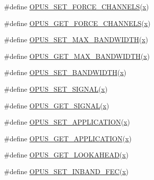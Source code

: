 \begin{DoxyCompactItemize}
\#define \hyperlink{group__opus__encoderctls_ga8450a745bd919a8de522afec115f3b5f}{O\+P\+U\+S\+\_\+\+S\+E\+T\+\_\+\+F\+O\+R\+C\+E\+\_\+\+C\+H\+A\+N\+N\+E\+LS}(\hyperlink{fmaths_8inl_a7ba8ab2f1e8f362163e17da3f15a5db9}{x})
\item 
\#define \hyperlink{group__opus__encoderctls_ga21f010167c5dfa1b53f20c46d473e86a}{O\+P\+U\+S\+\_\+\+G\+E\+T\+\_\+\+F\+O\+R\+C\+E\+\_\+\+C\+H\+A\+N\+N\+E\+LS}(\hyperlink{fmaths_8inl_a7ba8ab2f1e8f362163e17da3f15a5db9}{x})
\item 
\#define \hyperlink{group__opus__encoderctls_ga4f88288e89c595c07c61db316cc45289}{O\+P\+U\+S\+\_\+\+S\+E\+T\+\_\+\+M\+A\+X\+\_\+\+B\+A\+N\+D\+W\+I\+D\+TH}(\hyperlink{fmaths_8inl_a7ba8ab2f1e8f362163e17da3f15a5db9}{x})
\item 
\#define \hyperlink{group__opus__encoderctls_gaa3b5736de64792e1144ce12dfb87613c}{O\+P\+U\+S\+\_\+\+G\+E\+T\+\_\+\+M\+A\+X\+\_\+\+B\+A\+N\+D\+W\+I\+D\+TH}(\hyperlink{fmaths_8inl_a7ba8ab2f1e8f362163e17da3f15a5db9}{x})
\item 
\#define \hyperlink{group__opus__encoderctls_ga0178dabe5526d5b0667d81489cc93791}{O\+P\+U\+S\+\_\+\+S\+E\+T\+\_\+\+B\+A\+N\+D\+W\+I\+D\+TH}(\hyperlink{fmaths_8inl_a7ba8ab2f1e8f362163e17da3f15a5db9}{x})
\item 
\#define \hyperlink{group__opus__encoderctls_gaaa87ccee4ae46aa6c9528e03c5122b89}{O\+P\+U\+S\+\_\+\+S\+E\+T\+\_\+\+S\+I\+G\+N\+AL}(\hyperlink{fmaths_8inl_a7ba8ab2f1e8f362163e17da3f15a5db9}{x})
\item 
\#define \hyperlink{group__opus__encoderctls_ga640d434de535e2d2caec991c347303a4}{O\+P\+U\+S\+\_\+\+G\+E\+T\+\_\+\+S\+I\+G\+N\+AL}(\hyperlink{fmaths_8inl_a7ba8ab2f1e8f362163e17da3f15a5db9}{x})
\item 
\#define \hyperlink{group__opus__encoderctls_ga18fa17dae52ff8f3eaea314204bf1a36}{O\+P\+U\+S\+\_\+\+S\+E\+T\+\_\+\+A\+P\+P\+L\+I\+C\+A\+T\+I\+ON}(\hyperlink{fmaths_8inl_a7ba8ab2f1e8f362163e17da3f15a5db9}{x})
\item 
\#define \hyperlink{group__opus__encoderctls_ga062ebbc209caf6832fe4a309a459fd4c}{O\+P\+U\+S\+\_\+\+G\+E\+T\+\_\+\+A\+P\+P\+L\+I\+C\+A\+T\+I\+ON}(\hyperlink{fmaths_8inl_a7ba8ab2f1e8f362163e17da3f15a5db9}{x})
\item 
\#define \hyperlink{group__opus__encoderctls_gaf81b9e01501910adc67195ebb42b4a54}{O\+P\+U\+S\+\_\+\+G\+E\+T\+\_\+\+L\+O\+O\+K\+A\+H\+E\+AD}(\hyperlink{fmaths_8inl_a7ba8ab2f1e8f362163e17da3f15a5db9}{x})
\item 
\#define \hyperlink{group__opus__encoderctls_ga5b67dc832aa46c1c2f35752c46380545}{O\+P\+U\+S\+\_\+\+S\+E\+T\+\_\+\+I\+N\+B\+A\+N\+D\+\_\+\+F\+EC}(\hyperlink{fmaths_8inl_a7ba8ab2f1e8f362163e17da3f15a5db9}{x})

\end{DoxyCompactItemize}
